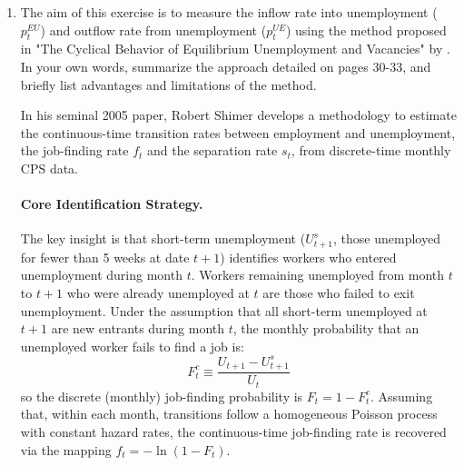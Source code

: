 \documentclass[dvipsnames,11pt]{article}
\begin{document}
        \begin{enumerate}
            \item The aim of this exercise is to measure the inflow rate  into unemployment ($p_t^{EU}$) and outflow rate from unemployment ($p_t^{UE}$) using the method proposed in {"The Cyclical Behavior of Equilibrium Unemployment and Vacancies"} by \textcite{shimer2005cyclical}. In your own words, summarize the approach detailed on pages 30-33, and briefly list advantages and limitations of the method.

                \begin{solution}
    
                    In his seminal 2005 paper, Robert Shimer develops a methodology to estimate the continuous-time transition rates between employment and unemployment, the job-finding rate $f_t$ and the separation rate $s_t$, from discrete-time monthly CPS data.

                    \paragraph{Core Identification Strategy.}
                        The key insight is that short-term unemployment ($U^s_{t+1}$, those unemployed for fewer than 5 weeks at date $t+1$) identifies workers who entered unemployment during month $t$. Workers remaining unemployed from month $t$ to $t+1$ who were already unemployed at $t$ are those who failed to exit unemployment. Under the assumption that all short-term unemployed at $t+1$ are new entrants during month $t$, the monthly probability that an unemployed worker fails to find a job is:
                        \begin{equation}
                            F^c_t \equiv \frac{U_{t+1} - U^s_{t+1}}{U_t}
                        \end{equation}
                        so the discrete (monthly) job-finding probability is $F_t = 1 - F^c_t$. Assuming that, within each month, transitions follow a homogeneous Poisson process with constant hazard rates, the continuous-time job-finding rate is recovered via the mapping $f_t = -\ln(1 - F_t)$.
                    

\end{solution}
\end{enumerate}
\end{document}
